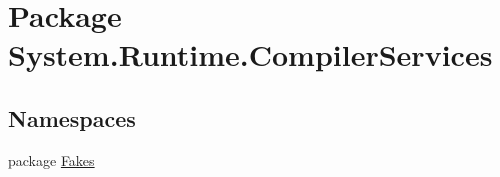 \hypertarget{namespace_system_1_1_runtime_1_1_compiler_services}{\section{Package System.\-Runtime.\-Compiler\-Services}
\label{namespace_system_1_1_runtime_1_1_compiler_services}
}
\subsection*{Namespaces}
\begin{DoxyCompactItemize}
\item 
package \hyperlink{namespace_system_1_1_runtime_1_1_compiler_services_1_1_fakes}{Fakes}
\end{DoxyCompactItemize}
